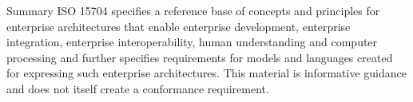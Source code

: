 \documentclass[10pt,letterpaper]{article}
\begin{document}
\begin{CornellNotesTable}
\end{CornellNotesTable}


\begin{CornellSummaryBox}{Summary}
ISO 15704 specifies a reference base of concepts and principles for enterprise architectures that enable enterprise development, enterprise integration, enterprise interoperability, human understanding and computer processing and further specifies requirements for models and languages created for expressing such enterprise architectures. This material is informative guidance and does not itself create a conformance requirement.
\end{CornellSummaryBox}
\end{document}
